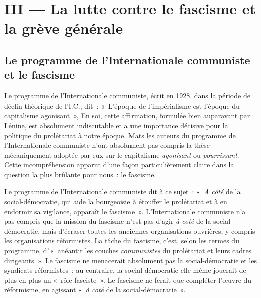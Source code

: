 \documentclass[french,twoside]{book} %
\begin{document}
\section[{III — La lutte contre le fascisme et la grève générale}]{III — La lutte contre le fascisme et la grève générale}
\subsection[{Le programme de l’Internationale communiste et le fascisme}]{Le programme de l’Internationale communiste et le fascisme}
\noindent Le programme de l’Internationale communiste, écrit en 1928, dans la période de déclin théorique de l’I.C., dit : « L’époque de l’impérialisme est l’époque du capitalisme agonisant », En soi, cette affirmation, formulée bien auparavant par Lénine, est absolument indiscutable et a une importance décisive pour la politique du prolétariat à notre époque. Mats les auteurs du programme de l’Internationale communiste n’ont absolument pas compris la thèse mécaniquement adoptée par eux sur le capitalisme \emph{agonisant} ou \emph{pourrissant}. Cette incompréhension apparut  d’une façon particulièrement claire dans la question la plus brûlante pour nous : le fascisme.\par
Le programme de l’Internationale communiste dit à ce sujet : « \emph{A côté} de la social-démocratie, qui aide la bourgeoisie à étouffer le prolétariat et à en endormir sa vigilance, apparaît le fascisme ». L’Internationale communiste n’a pas compris que la mission du fascisme n’est pas d’agir \emph{à coté} de la social-démocratie, mais d’écraser toutes les anciennes organisations ouvrières, y compris les organisations réformistes. La tâche du fascisme, c’est, selon les termes du programme, d’ « anéantir les couches \emph{communistes} du prolétariat et leurs cadres dirigeants ». Le fascisme ne menacerait absolument pas la social-démocratie et les syndicats réformistes ; au contraire, la social-démocratie elle-même jouerait de plus en plus un « rôle fasciste ». Le fascisme ne ferait que compléter l’œuvre du réformisme, en agissant « \emph{à coté} de la social-démocratie ».\par
\end{document}
